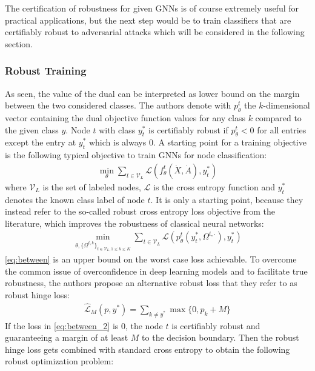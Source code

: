 \documentclass[a4paper,preprint]{sig-alternate}
\begin{document}
The certification of robustness for given GNNs is of course extremely useful for practical applications, but the next step would be to
train classifiers that are certifiably robust to adversarial attacks which will be considered in the following section.

\subsubsection{Robust Training}

As seen, the value of the dual can be interpreted as lower bound on the margin between the two considered classes.
The authors denote with $p_{\theta}^t$ the $k$-dimensional vector containing the dual objective function values
for any class $k$ compared to the given class $y$. Node $t$ with class $y_t^{\ast}$ is certifiably robust if $p_{\theta}^t < 0$ for all entries
except the entry at $y_t^{\ast}$ which is always $0$. A starting point for a training objective is the following typical objective 
to train GNNs for node classification:
\begin{gather}
    \min_{\theta} \sum_{t \in \mathcal{V}_L} \mathcal{L} (f_{\theta}^t (\dot{X}, \dot{A}), y_t^{\ast})
\end{gather}
where $\mathcal{V}_L$ is the set of labeled nodes, $\mathcal{L}$ is the
cross entropy function and $y_t^{\ast}$ denotes the known class label of node $t$.
It is only a starting point, because they instead refer to the so-called robust cross entropy loss objective from the literature,
which improves the robustness of classical neural networks:
\begin{gather}
\label{eq:between}
    \min_{\theta, \{\Omega^{t, k}\}_{t \in \mathcal{V}_L, 1 \leq k \leq K}} \sum_{t \in \mathcal{V}_L} \mathcal{L} (p_{\theta}^t (y_t^{\ast}, \Omega^{t, \cdot}), y_t^{\ast})
\end{gather}
\ref{eq:between} is an upper bound on the worst case loss achievable. To overcome the common issue of overconfidence in deep learning 
models and to facilitate true robustness, the authors propose an alternative robust loss that they refer to as robust hinge loss:
\begin{gather}
\label{eq:between_2}
    \mathcal{\hat{L}}_M (p, y^{\ast}) = \sum_{k \neq y^{\ast}} \max \{0, p_k + M\}
\end{gather}
If the loss in \ref{eq:between_2} is $0$, the node $t$ is certifiably robust and guaranteeing a margin of at least $M$ to the decision boundary.
Then the robust hinge loss gets combined with standard cross entropy to obtain the following robust optimization problem:
\end{document}
